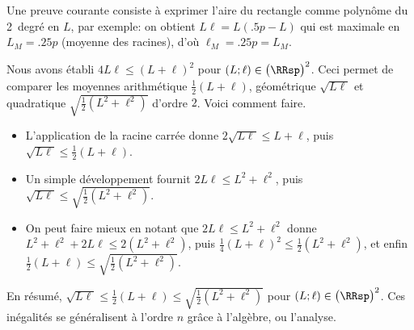 

\begin{remark}
    Une preuve courante consiste à exprimer l'aire du rectangle comme polynôme du 2\ieme\ degré en $L$, par exemple: on obtient $L \ell = L (\num{.5} p - L)$ qui est maximale en $L_M = \num{.25} p$ (moyenne des racines), d'où $\ell_M = \num{.25} p = L_M$.
\end{remark}




\begin{remark} \label{ineq-geo-quad-arith}
    Nous avons établi
    $4 L \ell \leq (L + \ell)^2$
    pour $(L ; \ell) \in \big( \RRsp \big)^2$.
    Ceci permet de comparer les moyennes arithmétique $\frac12 (L + \ell)$, géométrique $\sqrt{L \ell}$ et quadratique $\sqrt{\frac12 (L^2 + \ell^2)}$ d'ordre $2$.
    Voici comment faire.
    \begin{itemize}
        \item L'application de la racine carrée donne
        $2 \sqrt{L \ell} \leq L + \ell$, puis
        $\sqrt{L \ell} \leq \frac12 (L + \ell)$.

        \item Un simple développement fournit $2 L \ell \leq L^2 + \ell^2$, puis
        $\sqrt{L \ell} \leq \sqrt{\frac12 (L^2 + \ell^2)}$.

        \item On peut faire mieux en notant que $2 L \ell \leq L^2 + \ell^2$ donne
        $L^2 + \ell^2 + 2 L \ell \leq 2 (L^2 + \ell^2)$, puis
        $\frac14 (L + \ell)^2 \leq \frac12 (L^2 + \ell^2)$, et enfin
        $\frac12 (L + \ell) \leq \sqrt{\frac12 (L^2 + \ell^2)}$.
    \end{itemize}

    En résumé,
    $\sqrt{L \ell} \leq \frac12 (L + \ell) \leq \sqrt{\frac12 (L^2 + \ell^2)}$
    pour $(L ; \ell) \in \big( \RRsp \big)^2$.
    Ces inégalités se généralisent à l'ordre $n$ grâce à l'algèbre, ou l'analyse.
\end{remark}
